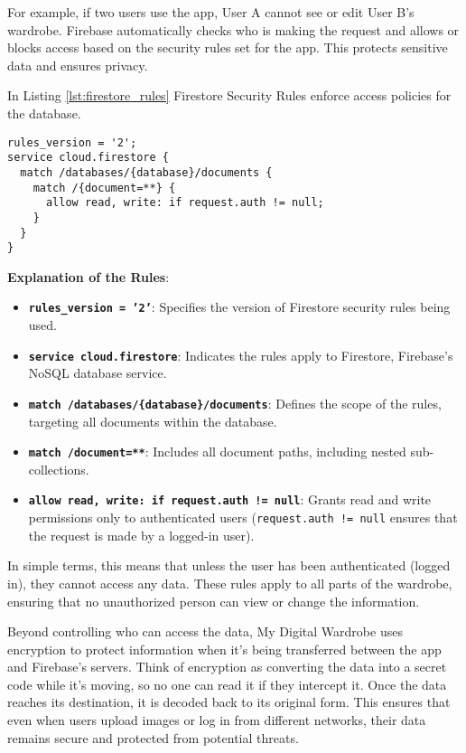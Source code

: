 For example, if two users use the app, User A cannot see or edit User B’s wardrobe. Firebase automatically checks who is making the request and allows or blocks access based on the security rules set for the app. This protects sensitive data and ensures privacy.

In Listing \ref{lst:firestore_rules} Firestore Security Rules enforce access policies for the database.

\begin{lstlisting}[caption={Firestore Security Rules}, label={lst:firestore_rules}]
rules_version = '2';
service cloud.firestore {
  match /databases/{database}/documents {
    match /{document=**} {
      allow read, write: if request.auth != null;
    }
  }
}
\end{lstlisting}

\noindent \textbf{Explanation of the Rules}:
\begin{itemize}
    \item \textbf{\texttt{rules\_version = '2'}}: Specifies the version of Firestore security rules being used.
    \item \textbf{\texttt{service cloud.firestore}}: Indicates the rules apply to Firestore, Firebase's NoSQL database service.
    \item \textbf{\texttt{match /databases/\{database\}/documents}}: Defines the scope of the rules, targeting all documents within the database.
    \item \textbf{\texttt{match /{document=**}}}: Includes all document paths, including nested sub-collections.
    \item \textbf{\texttt{allow read, write: if request.auth != null}}: Grants read and write permissions only to authenticated users (\texttt{request.auth != null} ensures that the request is made by a logged-in user).
\end{itemize}
In simple terms, this means that unless the user has been authenticated (logged in), they cannot access any data. These rules apply to all parts of the wardrobe, ensuring that no unauthorized person can view or change the information.

Beyond controlling who can access the data, My Digital Wardrobe uses encryption to protect information when it’s being transferred between the app and Firebase’s servers. Think of encryption as converting the data into a secret code while it’s moving, so no one can read it if they intercept it. Once the data reaches its destination, it is decoded back to its original form. This ensures that even when users upload images or log in from different networks, their data remains secure and protected from potential threats.


